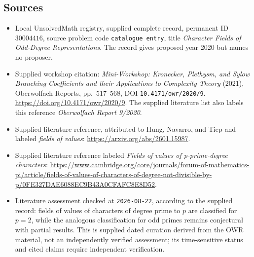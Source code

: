 \documentclass[11pt]{article}
\begin{document}
\subsection{Sources}
\begin{itemize}
\item Local UnsolvedMath registry, supplied complete record, permanent ID \(30004416\), source problem code \texttt{catalogue entry}, title \emph{Character Fields of Odd-Degree Representations}. The record gives proposed year 2020 but names no proposer.
\item Supplied workshop citation: \emph{Mini-Workshop: Kronecker, Plethysm, and Sylow Branching Coefficients and their Applications to Complexity Theory} (2021), Oberwolfach Reports, pp.~517--568, DOI \texttt{10.4171/owr/2020/9}. \url{https://doi.org/10.4171/owr/2020/9}. The supplied literature list also labels this reference \emph{Oberwolfach Report 9/2020}.
\item Supplied literature reference, attributed to Hung, Navarro, and Tiep and labeled \emph{fields of values}: \url{https://arxiv.org/abs/2601.15987}.
\item Supplied literature reference labeled \emph{Fields of values of p-prime-degree characters}: \url{https://www.cambridge.org/core/journals/forum-of-mathematics-pi/article/fields-of-values-of-characters-of-degree-not-divisible-by-p/0FE327DAE6088EC9B43A0CFAFC8E8D52}.
\item Literature assessment checked at \texttt{2026-08-22}, according to the supplied record: fields of values of characters of degree prime to \(p\) are classified for \(p=2\), while the analogous classification for odd primes remains conjectural with partial results. This is supplied dated curation derived from the OWR material, not an independently verified assessment; its time-sensitive status and cited claims require independent verification.
\end{itemize}
\end{document}
